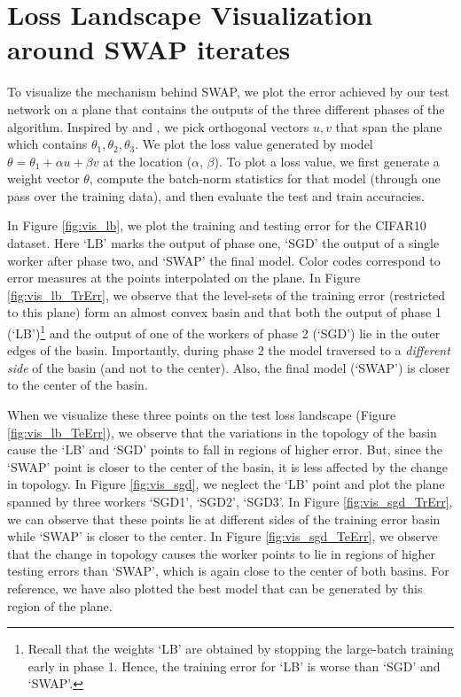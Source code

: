 \documentclass{article} %
\begin{document}
\section{Loss Landscape Visualization around SWAP iterates}

To visualize the mechanism behind SWAP, we plot the error achieved by our test
network on a plane that contains the outputs of the three different phases of the
algorithm. Inspired by \citep{garipov} and \citep{swa}, we pick orthogonal vectors $u, v$
that span the plane which contains $\theta_1, \theta_2, \theta_3$. We plot the loss 
value generated by model $\theta = \theta_1 + \alpha u + \beta v$ at the location
($\alpha$, $\beta$).
To plot a loss value, we first generate a weight vector $\theta$, compute the batch-norm
statistics for that model (through one pass over the training data), and
then evaluate the test and train accuracies. 

In Figure \ref{fig:vis_lb}, we plot the training and testing error for the
CIFAR10 dataset. Here `LB' marks the output of phase one, `SGD' the output of
a single worker after phase two, and `SWAP' the final model. Color codes
correspond to error measures at the points interpolated on the plane. 
In Figure \ref{fig:vis_lb_TrErr}, we observe that the level-sets of the training 
error (restricted to this plane) form an almost convex basin and that both the
output of phase 1 (`LB')\footnote{Recall that the weights `LB' are obtained by stopping the large-batch training early in phase 1. Hence, the training error for `LB' is worse than `SGD' and `SWAP'.} and the output of one of the workers of phase 2 (`SGD') 
lie in the outer edges of the basin. Importantly, during phase 2 the model
traversed to a \emph{different side} of the basin (and not to the center). Also, the final 
model (`SWAP') is closer to the center of the basin. 

When we visualize these 
three points on the test loss landscape (Figure \ref{fig:vis_lb_TeErr}), we observe
that the variations in the topology of the basin cause the `LB' and `SGD' 
points to fall in regions of higher error. But, since the `SWAP' point is closer 
to the center of the basin, it is less affected by the change in topology. 
In Figure \ref{fig:vis_sgd}, we neglect the `LB' point and plot the plane spanned
by three workers `SGD1', `SGD2', `SGD3'. In Figure \ref{fig:vis_sgd_TrErr}, we
can observe that these points lie at different sides of the training error
basin while `SWAP' is closer to the center. In Figure \ref{fig:vis_sgd_TeErr},
we observe that the change in topology causes the worker points to lie in
regions of higher testing errors than `SWAP', which is again close to the
center of both basins. For reference, we have also plotted the best model that
can be generated by this region of the plane.
\end{document}
